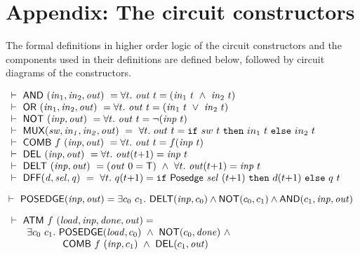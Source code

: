 \documentclass{llncs}
\begin{document}
\newpage
\section*{Appendix: The circuit constructors}
\label{CircuitConstructors}
\vspace*{-3mm}

The formal definitions in higher order logic of the circuit
constructors and the components used in their definitions are defined
below, followed by circuit diagrams of the constructors.

\begin{footnotesize}

\medskip
$
\begin{array}{l}
\TURNST\ \DEF{AND}\ (\sVAR{in}{1},\sVAR{in}{2},\VAR{out}) ~ = 
   \forall t.\ \VAR{out}\ t = (\sVAR{in}{1}\ t\ \AND\ \sVAR{in}{2}\ t)\\
\TURNST\ \DEF{OR}\ (\sVAR{in}{1},\sVAR{in}{2},\VAR{out}) ~ =
   \forall t.\ \VAR{out}\ t = (\sVAR{in}{1}\ t\ \OR\ \sVAR{in}{2}\ t)\\
\TURNST\ \DEF{NOT}\ (\VAR{inp},\VAR{out}) ~ = 
   \forall t.\ \VAR{out}\ t = \NOT(\VAR{inp}\ t)\\
\TURNST\ \DEF{MUX} (\VAR{sw,in_1,in_2,out})~ =~
 \forall t.\ out~t =  \IF{sw~t}{in_1~t}{in_2~t}\\
\TURNST\ \DEF{COMB}\ f\ \VAR{(inp,out)} ~ = \forall t.\ \VAR{out}\ t = f (\VAR{inp}\ t)\\
\TURNST\ \DEF{DEL}\ (\VAR{inp},\VAR{out}) ~ = \forall t.\ \VAR{out} (t{+}1) = \VAR{inp}\ t\\
\TURNST\ \DEF{DELT}\ (\VAR{inp},\VAR{out}) ~ = 
    (\VAR{out}\ 0 = \DEF{T})\ \AND\ 
    \forall t.\ \VAR{out} (t{+}1) = \VAR{inp}\ t\\
\TURNST\ \DEF{DFF} (\VAR{d,sel,q})~ =~
 \forall t.\ q (t{+}1) =  \IF{\DEF{Posedge}\ \VAR{sel}\ (t{+}1)}{d (t{+}1)}{q\ t}
\end{array}
$
 
\smallskip

$
\mbox{}\hspace*{-0.4mm}\TURNST\ \DEF{POSEDGE} (\VAR{inp},\VAR{out}) = 
    \exists c_0~ c_1.\ \DEF{DELT}(\VAR{inp},c_0) \AND
                  \DEF{NOT}(c_0, c_1) \AND \DEF{AND}(c_1,\VAR{inp},\VAR{out})
$

\smallskip


$
\begin{array}{l}
\TURNST\ \DEF{ATM}\ f\ (\VAR{load,inp,done,out}) =\\
\phantom{\TURNST\ ~~}    \exists c_0~ c_1.\ \DEF{POSEDGE} (\VAR{load}, c_0)\ \AND \ 
\DEF{NOT} (c_0, \VAR{done})\ \AND\\
\phantom{\TURNST\ ~~\exists c_0, c_1.\ }  \DEF{COMB}\ f\ (\VAR{inp},c_1)\ \AND\ \DEF{DEL} (c_1,\VAR{out})
\end{array}
$


\end{footnotesize}
\end{document}
